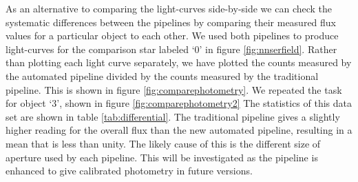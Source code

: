 

As an alternative to comparing the light-curves side-by-side we can check the systematic differences between the pipelines by comparing their measured flux values for a particular object to each other. We used both pipelines to produce light-curves for the comparison star labeled `0' in figure \ref{fig:nnserfield}. Rather than plotting each light curve separately, we have plotted the counts measured by the automated pipeline divided by the counts measured by the traditional pipeline. This is shown in figure \ref{fig:comparephotometry}. We repeated the task for object `3', shown in figure \ref{fig:comparephotometry2} The statistics of this data set are shown in table \ref{tab:differential}. The traditional pipeline gives a slightly higher reading for the overall flux than the new automated pipeline, resulting in a mean that is less than unity. The likely cause of this is the different size of aperture used by each pipeline. This will be investigated as the pipeline is enhanced to give calibrated photometry in future versions. 

